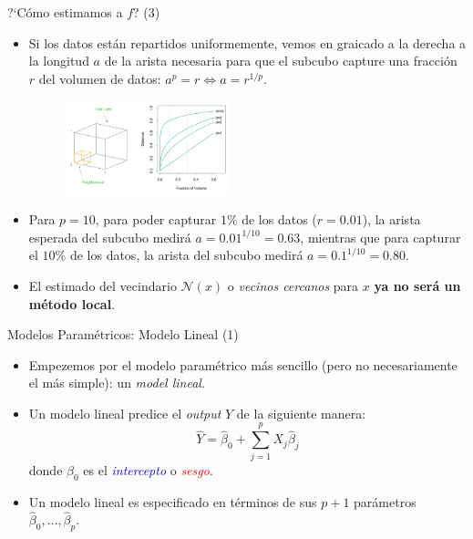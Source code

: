 \documentclass[usenames,dvipsnames]{beamer} %
\newcommand\bred[1]{\textcolor{red}{\textit{#1}}}
\newcommand\bblue[1]{\textcolor{blue}{\textit{#1}}}
\newcommand\defi[1]{\textcolor{NavyBlue}{\textit{#1}}}
\begin{document}
\begin{frame}{?`C\'omo estimamos a $f$? (3)}
    \begin{itemize}
        \item Si los datos est\'an repartidos uniformemente, vemos en graicado a la derecha a la longitud $a$ de la arista necesaria para que el subcubo capture una fracci\'on $r$ del volumen de datos: $a^p = r \iff a = r^{1/p}$.
        \begin{figure}
            \centering
            \includegraphics[width=0.45\textwidth]{images/esl/fig_2_6.PNG}
        \end{figure}
        \item Para $p=10$, para poder capturar $1\%$ de los datos ($r=0.01$), la arista esperada del subcubo medir\'a $a=0.01^{1/10}=0.63$, mientras que para capturar el $10\%$ de los datos, la arista del subcubo medir\'a $a=0.1^{1/10}=0.80$.
        \item El estimado del vecindario $\mathcal{N}(x)$ o \defi{vecinos cercanos} para $x$ \textbf{ya no ser\'a un m\'etodo local}.
    \end{itemize}
\end{frame}

\begin{frame}{Modelos Param\'etricos: Modelo Lineal (1)}
    \begin{itemize}
        \item Empezemos por el modelo param\'etrico m\'as sencillo (pero no necesariamente el m\'as simple): un \defi{model lineal}.
        \item Un modelo lineal predice el \textit{output} $Y$ de la siguiente manera:
        \begin{equation}\label{eq:1_modelo_lineal} \hat{Y} = \hat{\beta}_{0} + \sum_{j=1}^{p}X_{j}\hat{\beta}_{j} \end{equation}
        donde $\hat{\beta}_{0}$ es el \bblue{intercepto} o \bred{sesgo}.
        \item Un modelo lineal es especificado en t\'erminos de sus $p+1$ par\'ametros $\hat{\beta}_0, \dots, \hat{\beta}_p$.
    \end{itemize}
\end{frame}
\end{document}

